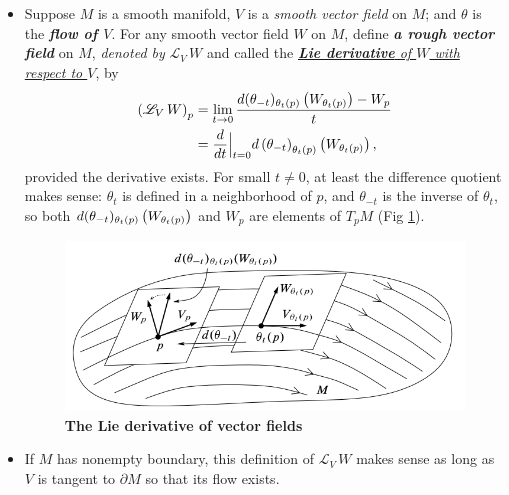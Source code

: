 \documentclass[11pt]{article}
\begin{document}
\begin{itemize}
\item \begin{definition}
Suppose $M$ is a smooth manifold, $V$ is a \emph{smooth vector field} on $M$; and $\theta$ is the \emph{\textbf{flow of $V$}}. For any
smooth vector field $W$ on $M$, define \emph{\textbf{a rough vector field}} on $M$, \emph{denoted by} $\mathscr{L}_{V}\,W$ and called the \underline{\emph{\textbf{Lie derivative} of $W$ with respect to $V$}}, by
\begin{align}
\left(\mathscr{L}_{V}\,W\right)_{p} &= \lim_{t\rightarrow 0}\frac{ d(\theta_{-t})_{\theta_{t}(p)}\left(W_{\theta_t(p)}\right)   - W_{p}}{t} \label{eqn: lie_derivative_formula}\\
&= \frac{d}{dt}\Bigr|_{t=0} d\left(\theta_{-t}\right)_{\theta_{t}(p)}\left(W_{\theta_t(p)}\right)  \nonumber,
\end{align}
provided the derivative exists. For small $t \neq 0$, at least the difference quotient makes sense: $\theta_t$ is defined in a neighborhood of $p$, and $\theta_{-t}$ is the inverse of $\theta_t$, so both $d(\theta_{-t})_{\theta_{t}(p)}\left(W_{\theta_t(p)}\right)$ and $W_p$ are elements of $T_{p}M$ (Fig \ref{fig: lie_derivatives}).
\end{definition}

\begin{figure}
\begin{minipage}[hb]{1\linewidth}
  \centering
  \centerline{\includegraphics[scale = 0.42]{lie_derivatives.png}}
\end{minipage}
\caption{\footnotesize{\textbf{The Lie derivative of vector fields  \citep{lee2003introduction}}}}
\label{fig: lie_derivatives}
\end{figure}

\item \begin{remark}
If $M$ has nonempty boundary, this definition of  $\mathscr{L}_{V}\,W$ makes sense as long as $V$ is tangent to $\partial M$ so that its flow exists.
\end{remark}


\end{itemize}
\end{document}

